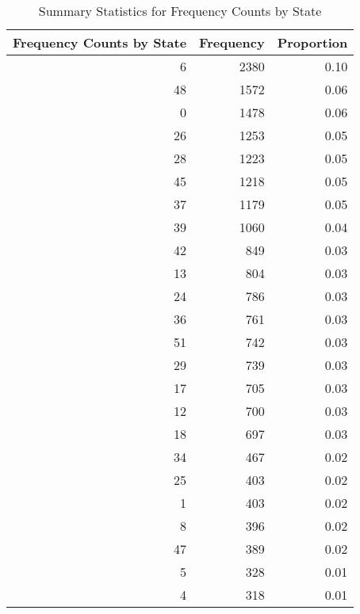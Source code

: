 \begin{table}
\centering
\caption{Summary Statistics for Frequency Counts by State}
\label{tab:state}
\begin{tabular}{rrr}
\toprule
 Frequency Counts by State &  Frequency &  Proportion \\
\midrule
                         6 &       2380 &        0.10 \\
                        48 &       1572 &        0.06 \\
                         0 &       1478 &        0.06 \\
                        26 &       1253 &        0.05 \\
                        28 &       1223 &        0.05 \\
                        45 &       1218 &        0.05 \\
                        37 &       1179 &        0.05 \\
                        39 &       1060 &        0.04 \\
                        42 &        849 &        0.03 \\
                        13 &        804 &        0.03 \\
                        24 &        786 &        0.03 \\
                        36 &        761 &        0.03 \\
                        51 &        742 &        0.03 \\
                        29 &        739 &        0.03 \\
                        17 &        705 &        0.03 \\
                        12 &        700 &        0.03 \\
                        18 &        697 &        0.03 \\
                        34 &        467 &        0.02 \\
                        25 &        403 &        0.02 \\
                         1 &        403 &        0.02 \\
                         8 &        396 &        0.02 \\
                        47 &        389 &        0.02 \\
                         5 &        328 &        0.01 \\
                         4 &        318 &        0.01 \\

\end{tabular}
\end{table}
